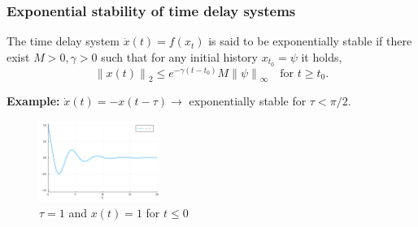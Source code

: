 \documentclass[11pt,aspectratio=169]{beamer}
\newcommand{\norm}[1]{\left\lVert#1\right\rVert}
\begin{document}
\begin{frame}[t]
    \frametitle{Exponential stability of time delay systems}
    \begin{definition}
    The time delay system $\dot{x}(t) = f(x_t)$ is said to be exponentially stable if there exist $M>0, \gamma>0$ such that for any initial history $x_{t_0} = \psi$ it holds,
    $$\norm{x(t)}_2 \leq e^{-\gamma (t-t_0)}M\norm{\psi}_\infty \quad \text{for } t\geq t_0.$$
    \end{definition}
    \textbf{Example: } $\dot{x}(t) = -x(t-\tau) \to$ exponentially stable for $\tau<\pi/2$.
    \begin{figure}
        \centering
        \includegraphics[width=0.35\textwidth]{figures/linear_dde.png}
        \vspace{-0.2cm}
        \caption{$\tau = 1$ and $x(t)=1$ for $t\leq 0$}
    \end{figure}
    
\end{frame}

\end{document}
